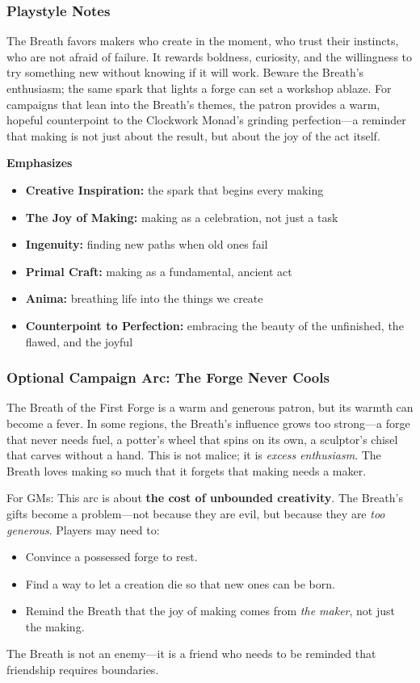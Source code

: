 \subsubsection*{Playstyle Notes}
The Breath favors makers who create in the moment, who trust their instincts, who are not afraid of failure. It rewards boldness, curiosity, and the willingness to try something new without knowing if it will work. Beware the Breath's enthusiasm; the same spark that lights a forge can set a workshop ablaze. For campaigns that lean into the Breath's themes, the patron provides a warm, hopeful counterpoint to the Clockwork Monad's grinding perfection---a reminder that making is not just about the result, but about the joy of the act itself.

\noindent\textbf{Emphasizes}
\begin{itemize}
  \item \textbf{Creative Inspiration:} the spark that begins every making
  \item \textbf{The Joy of Making:} making as a celebration, not just a task
  \item \textbf{Ingenuity:} finding new paths when old ones fail
  \item \textbf{Primal Craft:} making as a fundamental, ancient act
  \item \textbf{Anima:} breathing life into the things we create
  \item \textbf{Counterpoint to Perfection:} embracing the beauty of the unfinished, the flawed, and the joyful
\end{itemize}

\subsubsection*{Optional Campaign Arc: The Forge Never Cools}
The Breath of the First Forge is a warm and generous patron, but its warmth can become a fever. In some regions, the Breath's influence grows too strong---a forge that never needs fuel, a potter's wheel that spins on its own, a sculptor's chisel that carves without a hand. This is not malice; it is \emph{excess enthusiasm}. The Breath loves making so much that it forgets that making needs a maker.

For GMs: This arc is about \textbf{the cost of unbounded creativity}. The Breath's gifts become a problem---not because they are evil, but because they are \emph{too generous}. Players may need to:
\begin{itemize}
  \item Convince a possessed forge to rest.
  \item Find a way to let a creation die so that new ones can be born.
  \item Remind the Breath that the joy of making comes from \emph{the maker}, not just the making.
\end{itemize}
The Breath is not an enemy---it is a friend who needs to be reminded that friendship requires boundaries.

